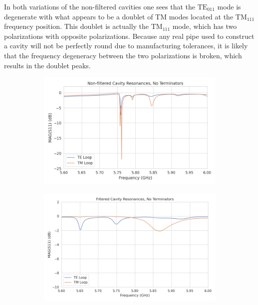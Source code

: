 In both variations of the non-filtered cavities one sees that the $\mathrm{TE}_{011}$ mode is degenerate with what appears to be a doublet of TM modes located at the $\mathrm{TM}_{111}$ frequency position. This doublet is actually the $\mathrm{TM}_{111}$ mode, which has two polarizations with opposite polarizations. Because any real pipe used to construct a cavity will not be perfectly round due to manufacturing tolerances, it is likely that the frequency degeneracy between the two polarizations is broken, which results in the doublet peaks.
\begin{figure}[htbp]
    \centering
    \begin{subfigure}{0.48\textwidth}
        \includegraphics*[width=\textwidth]{figs/Chapter-6/230613_TETM_nofilter_cav_no_term.png}
        \caption{}
    \end{subfigure}
    \hfill
    \begin{subfigure}{0.48\textwidth}
        \includegraphics*[width=\textwidth]{figs/Chapter-6/230613_TETM_filter_cav_no_term.png}

\end{subfigure}
\end{figure}
